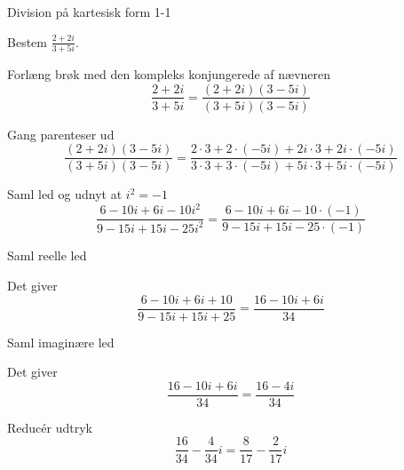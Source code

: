\documentclass{article}
\begin{document}
\tableofcontents
\newpage

\begin{exercise}{Division på kartesisk form 1-1}

Bestem $\frac{2+2i}{3+5i}$.



\hint 

Forlæng brøk med den kompleks konjungerede af nævneren
\[
\frac{2+2i}{3+5i} = \frac{(2+2i)(3-5i)}{(3+5i)(3-5i)}
\]

\hint

Gang parenteser ud
\[
\frac{(2+2i)(3-5i)}{(3+5i)(3-5i)} = \frac{2 \cdot 3 + 2\cdot (-5i) + 2i \cdot 3 + 2i \cdot (-5i)}{3 \cdot 3 + 3\cdot (-5i)+5i \cdot 3 + 5i \cdot (-5i)}
\]

\hint 

Saml led og udnyt at $i^2 = -1$
\[
\frac{6-10i+6i-10i^2}{9-15i+15i-25i^2} = \frac{6-10i+6i-10 \cdot (-1)}{9-15i+15i-25 \cdot (-1)} 
\]

\hint

Saml reelle led

\hint

Det giver
\[
\frac{6-10i+6i+10}{9-15i+15i+ 25} = \frac{16 -10i + 6i}{34}
\]

\hint

Saml imaginære led


\hint

Det giver 
\[
\frac{16 -10i + 6i}{34} = \frac{16-4i}{34}
\]

\hint

Reducér udtryk
\[
\frac{16}{34} - \frac{4}{34}i  =\frac{8}{17} - \frac{2}{17}i
\]

\end{exercise}

\newpage
\end{document}
